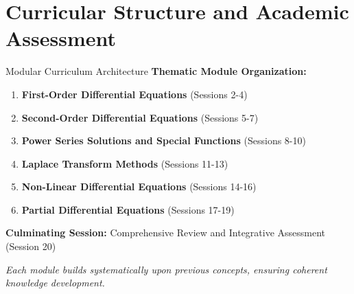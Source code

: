 \documentclass[10pt,aspectratio=169]{beamer}
\newcommand{\highlight}[1]{\textcolor{mLightBrown}{\textbf{#1}}}
\newcommand{\concept}[1]{\textcolor{mDarkTeal}{\textbf{#1}}}
\newcommand{\emphasis}[1]{\textit{#1}}
\begin{document}
\section{Curricular Structure and Academic Assessment}

\begin{frame}{Modular Curriculum Architecture}
    \concept{Thematic Module Organization:}
    
    \vspace{0.3cm}
    
    \begin{enumerate}
        \item \highlight{First-Order Differential Equations} (Sessions 2-4)
        \item \highlight{Second-Order Differential Equations} (Sessions 5-7)
        \item \highlight{Power Series Solutions and Special Functions} (Sessions 8-10)
        \item \highlight{Laplace Transform Methods} (Sessions 11-13)
        \item \highlight{Non-Linear Differential Equations} (Sessions 14-16)
        \item \highlight{Partial Differential Equations} (Sessions 17-19)
    \end{enumerate}
    
    \vspace{0.3cm}
    
    \concept{Culminating Session:} Comprehensive Review and Integrative Assessment (Session 20)
    
    \vspace{0.2cm}
    
    \emphasis{Each module builds systematically upon previous concepts, ensuring coherent knowledge development.}
\end{frame}
\end{document}
